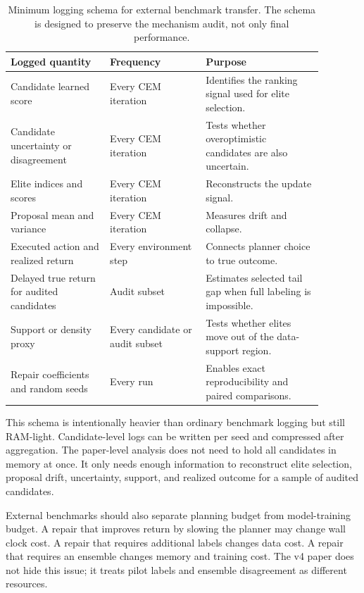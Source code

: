 \begin{table}[t]
\centering
\small
\begin{tabular}{p{0.28\linewidth}p{0.27\linewidth}p{0.33\linewidth}}
\toprule
Logged quantity & Frequency & Purpose \\
\midrule
Candidate learned score & Every CEM iteration & Identifies the ranking signal
used for elite selection. \\
Candidate uncertainty or disagreement & Every CEM iteration & Tests whether
overoptimistic candidates are also uncertain. \\
Elite indices and scores & Every CEM iteration & Reconstructs the update
signal. \\
Proposal mean and variance & Every CEM iteration & Measures drift and
collapse. \\
Executed action and realized return & Every environment step & Connects
planner choice to true outcome. \\
Delayed true return for audited candidates & Audit subset & Estimates selected
tail gap when full labeling is impossible. \\
Support or density proxy & Every candidate or audit subset & Tests whether
elites move out of the data-support region. \\
Repair coefficients and random seeds & Every run & Enables exact
reproducibility and paired comparisons. \\
\bottomrule
\end{tabular}
\caption{Minimum logging schema for external benchmark transfer. The schema is
designed to preserve the mechanism audit, not only final performance.}
\label{tab:logging-schema}
\end{table}

This schema is intentionally heavier than ordinary benchmark logging but still
RAM-light. Candidate-level logs can be written per seed and compressed after
aggregation. The paper-level analysis does not need to hold all candidates in
memory at once. It only needs enough information to reconstruct elite
selection, proposal drift, uncertainty, support, and realized outcome for a
sample of audited candidates.

External benchmarks should also separate planning budget from model-training
budget. A repair that improves return by slowing the planner may change wall
clock cost. A repair that requires additional labels changes data cost. A
repair that requires an ensemble changes memory and training cost. The v4
paper does not hide this issue; it treats pilot labels and ensemble
disagreement as different resources.

